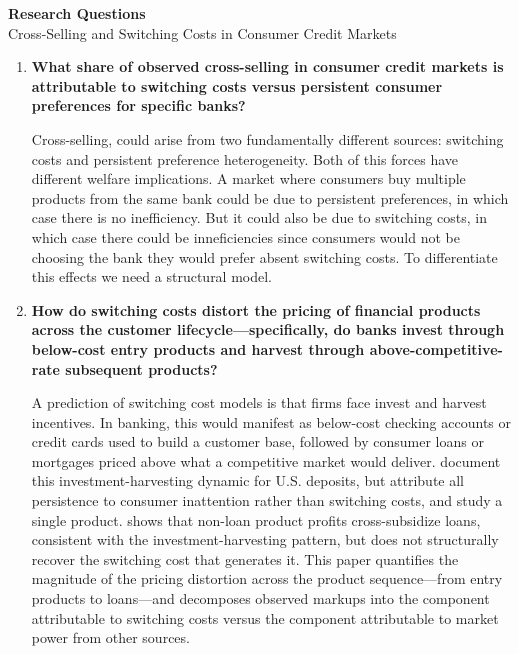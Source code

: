 \documentclass[12pt]{article}
\theoremstyle{plain}
\theoremstyle{plain}
\theoremstyle{definition}  %
\theoremstyle{remark}  %
\begin{document}
\begin{center}
    {\Large \textbf{Research Questions}} \\[6pt]
    Cross-Selling and Switching Costs in Consumer Credit Markets
\end{center}

\bigskip

\begin{enumerate}

\item \textbf{What share of observed cross-selling in consumer credit markets is attributable to switching costs versus persistent consumer preferences for specific banks?}

Cross-selling, could arise from two fundamentally different sources: switching costs and persistent preference heterogeneity. 
Both of this forces have different welfare implications. A market where consumers buy multiple products from the same bank could be due to persistent preferences, in which case there is no inefficiency. But it could also be due to switching costs, in which case there could be inneficiencies since consumers would not be choosing the bank they would prefer absent switching costs. To differentiate this effects we need a structural model. 






\item \textbf{How do switching costs distort the pricing of financial products across the customer lifecycle---specifically, do banks invest through below-cost entry products and harvest through above-competitive-rate subsequent products?}

A  prediction of switching cost models is that firms face invest and harvest incentives. In banking, this would manifest as below-cost checking accounts or credit cards used to build a customer base, followed by consumer loans or mortgages priced above what a competitive market would deliver.
\textcite{egan_dynamic_2025} document this investment-harvesting dynamic for U.S. deposits, but attribute all persistence to consumer inattention rather than switching costs, and study a single product. \textcite{qi_big_2024} shows that non-loan product profits cross-subsidize loans, consistent with the investment-harvesting pattern, but does not structurally recover the switching cost that generates it. This paper quantifies the magnitude of the pricing distortion across the product sequence---from entry products to loans---and decomposes observed markups into the component attributable to switching costs versus the component attributable to market power from other sources.


\end{enumerate}
\end{document}
